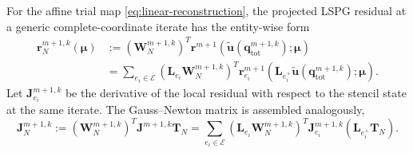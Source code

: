 \documentclass[11pt]{article}
\newcommand{\qtot}{\mathbf q_{\mathrm{tot}}}
\newcommand{\utilde}{\widetilde{\mathbf u}}
\newcommand{\mub}{\bm\mu}
\begin{document}
For the affine trial map \eqref{eq:linear-reconstruction}, the projected
LSPG residual at a generic complete-coordinate iterate has the entity-wise
form
\begin{equation}
\begin{aligned}
\mathbf r_N^{m+1,k}(\mub)
&:=\left(\mathbf W_N^{m+1,k}\right)^T
\mathbf r^{m+1}\!\left(\utilde(\qtot^{m+1,k});\mub\right)\\
&=\sum_{e_i\in\mathcal E}
\left(\mathbf L_{e_i}\mathbf W_N^{m+1,k}\right)^T
\mathbf r_{e_i}^{m+1}\!\left(
\mathbf L_{e_i^+}\utilde(\qtot^{m+1,k});\mub\right).
\end{aligned}
\label{eq:linear-projected-residual}
\end{equation}
Let $\mathbf J_{e_i}^{m+1,k}$ be the derivative of the local residual with
respect to the stencil state at the same iterate.  The Gauss--Newton matrix
is assembled analogously,
\begin{equation}
\mathbf J_N^{m+1,k}:=
\left(\mathbf W_N^{m+1,k}\right)^T\mathbf J^{m+1,k}\mathbf T_N
=\sum_{e_i\in\mathcal E}
\left(\mathbf L_{e_i}\mathbf W_N^{m+1,k}\right)^T
\mathbf J_{e_i}^{m+1,k}\left(\mathbf L_{e_i^+}\mathbf T_N\right).
\label{eq:linear-projected-jacobian}
\end{equation}
\end{document}

